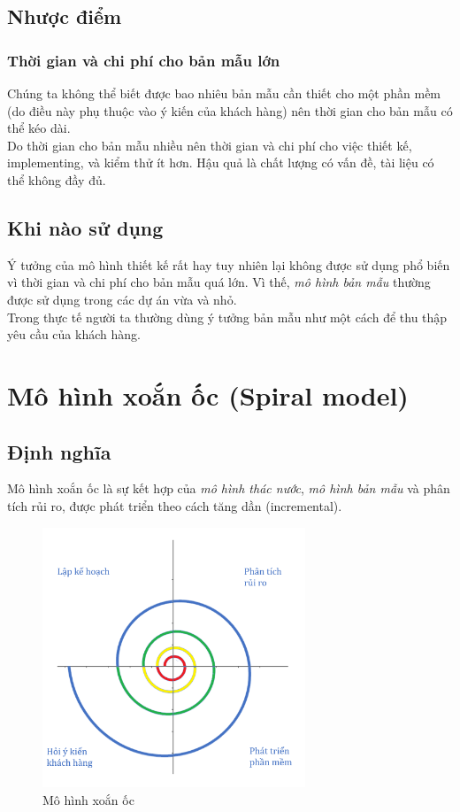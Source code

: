 \documentclass[14pt]{extarticle}
\begin{document}
\subsection{Nhược điểm}
\subsubsection*{Thời gian và chi phí cho bản mẫu lớn}
Chúng ta không thể biết được bao nhiêu bản mẫu cần thiết cho một phần mềm (do
điều này phụ thuộc vào ý kiến của khách hàng) nên thời gian cho bản mẫu
có thể kéo dài.\\
Do thời gian cho bản mẫu nhiều nên thời gian và chi phí cho việc thiết kế,
implementing, và kiểm thử ít hơn. Hậu quả là chất lượng có vấn đề, tài liệu
có thể không đầy đủ.

\subsection{Khi nào sử dụng}
Ý tưởng của mô hình thiết kế rất hay tuy nhiên lại không được sử dụng phổ biến
vì thời gian và chi phí cho bản mẫu quá lớn.
Vì thế, \textit{mô hình bản mẫu} thường được sử dụng trong các dự án vừa và nhỏ.\\

Trong thực tế người ta thường dùng ý tưởng bản mẫu như một cách để thu thập
yêu cầu của khách hàng.

\newpage
\section{Mô hình xoắn ốc (Spiral model)}
\subsection{Định nghĩa}

Mô hình xoắn ốc là sự kết hợp của \textit{mô hình thác nước}, \textit{mô hình bản mẫu}
và phân tích rủi ro, được phát triển theo cách tăng dần (incremental).\\

\begin{figure}[h]
  \centering
  \includegraphics[width=0.7\textwidth]{spiral.png}
  \caption{Mô hình xoắn ốc}
  \label{fig:spiral-model}
\end{figure}
\end{document}
